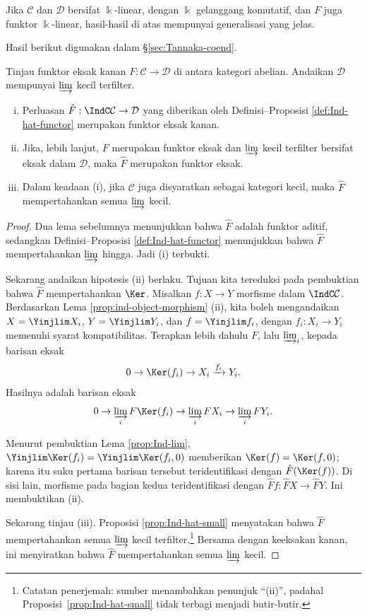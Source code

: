 Jika $\mathcal{C}$ dan $\mathcal{D}$ bersifat $\Bbbk$-linear, dengan $\Bbbk$ gelanggang komutatif, dan $F$ juga funktor $\Bbbk$-linear, hasil-hasil di atas mempunyai generalisasi yang jelas.

Hasil berikut digunakan dalam \S\ref{sec:Tannaka-coend}.

\begin{proposition}\label{prop:Ind-ext-exactness}
	Tinjau funktor eksak kanan $F:\mathcal{C}\to\mathcal{D}$ di antara kategori abelian. Andaikan $\mathcal{D}$ mempunyai $\varinjlim$ kecil terfilter.
	\begin{enumerate}[(i)]
		\item Perluasan $\hat{F}:\IndC\mathcal{C}\to\mathcal{D}$ yang diberikan oleh Definisi--Proposisi \ref{def:Ind-hat-functor} merupakan funktor eksak kanan.
		\item Jika, lebih lanjut, $F$ merupakan funktor eksak dan $\varinjlim$ kecil terfilter bersifat eksak dalam $\mathcal{D}$, maka $\hat{F}$ merupakan funktor eksak.
		\item Dalam keadaan (i), jika $\mathcal{C}$ juga disyaratkan sebagai kategori kecil, maka $\hat{F}$ mempertahankan semua $\varinjlim$ kecil.
	\end{enumerate}
\end{proposition}
\begin{proof}
	Dua lema sebelumnya menunjukkan bahwa $\hat{F}$ adalah funktor aditif, sedangkan Definisi--Proposisi \ref{def:Ind-hat-functor} menunjukkan bahwa $\hat{F}$ mempertahankan $\varinjlim$ hingga. Jadi (i) terbukti.
	
	Sekarang andaikan hipotesis (ii) berlaku. Tujuan kita tereduksi pada pembuktian bahwa $\hat{F}$ mempertahankan $\Ker$. Misalkan $f:X\to Y$ morfisme dalam $\IndC\mathcal{C}$. Berdasarkan Lema \ref{prop:ind-object-morphism} (ii), kita boleh mengandaikan $X=\Yinjlim X_i$, $Y=\Yinjlim Y_i$, dan $f=\Yinjlim f_i$, dengan $f_i:X_i\to Y_i$ memenuhi syarat kompatibilitas. Terapkan lebih dahulu $F$, lalu $\varinjlim_i$, kepada barisan eksak
	\[ 0 \to \Ker(f_i) \to X_i \xrightarrow{f_i} Y_i. \]
	Hasilnya adalah barisan eksak
	\[ 0 \to \varinjlim_i F\Ker(f_i) \to \varinjlim_i FX_i \to \varinjlim_i FY_i. \]
	
	Menurut pembuktian Lema \ref{prop:Ind-lim}, $\Yinjlim\Ker(f_i)=\Yinjlim\Ker(f_i,0)$ memberikan $\Ker(f)=\Ker(f,0)$; karena itu suku pertama barisan tersebut teridentifikasi dengan $\hat{F}(\Ker(f))$. Di sisi lain, morfisme pada bagian kedua teridentifikasi dengan $\hat{F}f:\hat{F}X\to\hat{F}Y$. Ini membuktikan (ii).
	
	Sekarang tinjau (iii). Proposisi \ref{prop:Ind-hat-small} menyatakan bahwa $\hat{F}$ mempertahankan semua $\varinjlim$ kecil terfilter.\footnote{Catatan penerjemah: sumber menambahkan penunjuk ``(ii)'', padahal Proposisi~\ref{prop:Ind-hat-small} tidak terbagi menjadi butir-butir.} Bersama dengan keeksakan kanan, ini menyiratkan bahwa $\hat{F}$ mempertahankan semua $\varinjlim$ kecil.
\end{proof}

